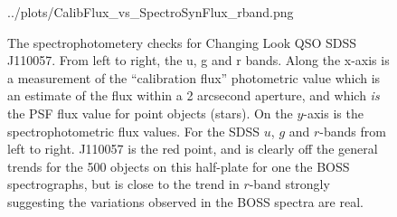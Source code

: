 \documentclass[apj]{emulateapj}
\begin{document}
\begin{figure}
  {../plots/CalibFlux_vs_SpectroSynFlux_rband.png}
  \centering
  \caption[]{The spectrophotometery checks for Changing Look QSO SDSS J110057. 
    From left to right, the u, g and r bands. 
    Along the x-axis is a measurement of the ``calibration flux'' photometric value 
    which is an estimate of the flux within a 2 arcsecond aperture, and which {\it is} 
    the PSF flux value for point objects (stars). On the $y$-axis is the spectrophotometric
    flux values. For the SDSS $u$, $g$ and $r$-bands from left to right. 
J110057 is the red point, and is clearly off the general trends for the 500 objects 
on this half-plate for one the BOSS spectrographs, but is close to the trend in 
$r$-band strongly suggesting the variations observed in the BOSS spectra are real.} 
 \label{fig:w1100m0052_halpha}
\end{figure}



 

\end{document}
